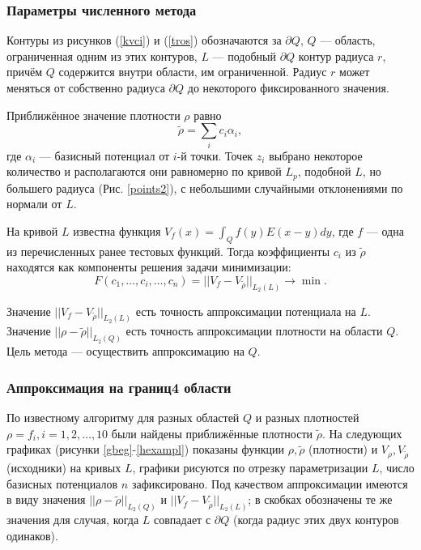 \documentclass[a4paper, 12pt]{article}
\newcommand{\V}[1]{\int_Q #1(y) E(x-y) dy}
\begin{document}
\subsubsection{Параметры численного метода}
Контуры из рисунков (\ref{kvci}) и (\ref{tros}) обозначаются за $\partial Q$, $Q$ --- область, ограниченная одним из этих контуров,
$L$ --- подобный $\partial Q$ контур радиуса $r$, причём $Q$ содержится внутри области, им ограниченной. Радиус $r$ может меняться от собственно радиуса $\partial Q$ до некоторого фиксированного значения.

Приближённое значение плотности $\rho$ равно
\begin{equation*}
  \tilde{\rho} = \sum_i c_i \alpha_i,
\end{equation*}
где $\alpha_i$ --- базисный потенциал от $i$-й точки.
Точек $z_i$ выбрано некоторое количество и располагаются они равномерно по кривой $L_p$, подобной $L$, но большего радиуса (Рис. \ref{points2}), с небольшими случайными отклонениями по нормали от $L$.

На кривой $L$ известна функция $V_f(x)=\V{f}$, где $f$ --- одна из перечисленных ранее тестовых функций.
Тогда коэффициенты $c_i$ из $\tilde{\rho}$ находятся как компоненты решения задачи минимизации:
\begin{equation*}
  F(c_1,\dots,c_i,\dots,c_n)=||V_f-V_{\tilde{\rho} } ||_{L_2(L)}\rightarrow \min.
\end{equation*}

Значение $||V_f-V_{\tilde{\rho} } ||_{L_2(L)}$ есть точность аппроксимации потенциала на $L$.
Значение $||\rho-\tilde{\rho} ||_{L_2(Q)}$ есть точность аппроксимации плотности на области $Q$.
Цель метода --- осуществить аппроксимацию на $Q$.

\subsubsection{Аппроксимация на границ4 области}
По известному алгоритму для разных областей $Q$ и разных плотностей $\rho=f_i,i=1,2,\dots,10$ были найдены приближённые плотности $\tilde{\rho}$.
На следующих графиках (рисунки \ref{gbeg}-\ref{hexampl}) показаны функции $\rho, \tilde{\rho}$ (плотности) и $V_{\rho},V_{\tilde{\rho}}$ (исходники) на кривых $L$, графики рисуются по отрезку параметризации $L$, число базисных потенциалов $n$ зафиксировано.
Под качеством аппроксимации имеются в виду значения $||\rho-\tilde{\rho} ||_{L_2(Q)}$ и $||V_f-V_{\tilde{\rho} } ||_{L_2(L)}$; в скобках обозначены те же значения для случая, когда $L$ совпадает с $\partial Q$ (когда радиус этих двух контуров одинаков).
\end{document}
